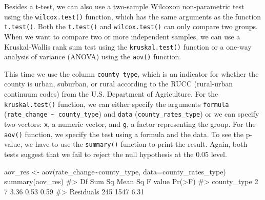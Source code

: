 \documentclass[
  letterpaper,
]{krantz}
\makeatletter
\newenvironment{Shaded}{\begin{snugshade}}{\end{snugshade}}
\newcommand{\AttributeTok}[1]{\textcolor[rgb]{0.40,0.45,0.13}{#1}}
\newcommand{\CommentTok}[1]{\textcolor[rgb]{0.37,0.37,0.37}{#1}}
\newcommand{\FunctionTok}[1]{\textcolor[rgb]{0.28,0.35,0.67}{#1}}
\newcommand{\NormalTok}[1]{\textcolor[rgb]{0.00,0.23,0.31}{#1}}
\newcommand{\OtherTok}[1]{\textcolor[rgb]{0.00,0.23,0.31}{#1}}
\newcommand{\SpecialCharTok}[1]{\textcolor[rgb]{0.37,0.37,0.37}{#1}}
\newenvironment{kframe}{%
\medskip{}
\setlength{\fboxsep}{.8em}
 \def\at@end@of@kframe{}%
 \ifinner\ifhmode%
  \def\at@end@of@kframe{\end{minipage}}%
  \begin{minipage}{\columnwidth}%
 \fi\fi%
 \def\FrameCommand##1{\hskip\@totalleftmargin \hskip-\fboxsep
 \colorbox{shadecolor}{##1}\hskip-\fboxsep
     \hskip-\linewidth \hskip-\@totalleftmargin \hskip\columnwidth}%
 \MakeFramed {\advance\hsize-\width
   \@totalleftmargin\z@ \linewidth\hsize
   \@setminipage}}%
 {\par\unskip\endMakeFramed%
 \at@end@of@kframe}
\renewenvironment{Shaded}{\begin{kframe}}{\end{kframe}}
\makeatother
\begin{document}
Besides a t-test, we can also use a two-sample Wilcoxon non-parametric
test using the \texttt{wilcox.test()} function, which has the same
arguments as the function \texttt{t.test()}. Both the \texttt{t.test()}
and \texttt{wilcox.test()} can only compare two groups. When we want to
compare two or more independent samples, we can use a Kruskal-Wallis
rank sum test using the \texttt{kruskal.test()} function or a one-way
analysis of variance (ANOVA) using the \texttt{aov()} function.

This time we use the column \texttt{county\_type}, which is an indicator
for whether the county is urban, suburban, or rural according to the
RUCC (rural-urban continuum codes) from the U.S. Department of
Agriculture. For the \texttt{kruskal.test()} function, we can either
specify the arguments \texttt{formula}
(\texttt{rate\_change\ \textasciitilde{}\ county\_type}) and
\texttt{data} (\texttt{county\_rates\_type}) or we can specify two
vectors: \texttt{x}, a numeric vector, and \texttt{g}, a factor
representing the group. For the \texttt{aov()} function, we specify the
test using a formula and the data. To see the p-value, we have to use
the \texttt{summary()} function to print the result. Again, both tests
suggest that we fail to reject the null hypothesis at the 0.05 level.

\begin{Shaded}
\end{Shaded}

\begin{Shaded}
\begin{Highlighting}[]
\NormalTok{aov\_res }\OtherTok{\textless{}{-}} \FunctionTok{aov}\NormalTok{(rate\_change}\SpecialCharTok{\textasciitilde{}}\NormalTok{county\_type, }\AttributeTok{data=}\NormalTok{county\_rates\_type)}
\FunctionTok{summary}\NormalTok{(aov\_res)}
\CommentTok{\#\textgreater{}              Df Sum Sq Mean Sq F value Pr(\textgreater{}F)}
\CommentTok{\#\textgreater{} county\_type   2      7    3.36    0.53   0.59}
\CommentTok{\#\textgreater{} Residuals   245   1547    6.31}
\end{Highlighting}
\end{Shaded}
\end{document}
